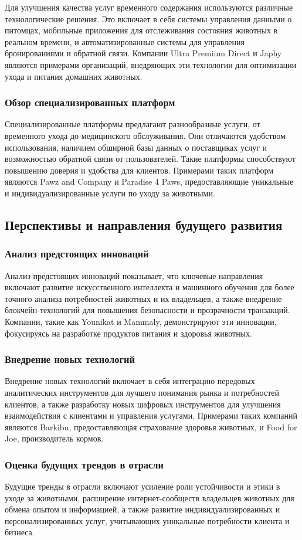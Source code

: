 Для улучшения качества услуг временного содержания используются различные технологические решения. Это включает в себя системы управления данными о питомцах, мобильные приложения для отслеживания состояния животных в реальном времени, и автоматизированные системы для управления бронированиями и обратной связи. Компании Ultra Premium Direct и Japhy являются примерами организаций, внедряющих эти технологии для оптимизации ухода и питания домашних животных.
\subsubsection{Обзор специализированных платформ}

Специализированные платформы предлагают разнообразные услуги, от временного ухода до медицинского обслуживания. Они отличаются удобством использования, наличием обширной базы данных о поставщиках услуг и возможностью обратной связи от пользователей. Такие платформы способствуют повышению доверия и удобства для клиентов. Примерами таких платформ являются Pawz and Company и Paradise 4 Paws, предоставляющие уникальные и индивидуализированные услуги по уходу за животными.
\subsection{Перспективы и направления будущего развития}
\subsubsection{Анализ предстоящих инноваций}

Анализ предстоящих инноваций показывает, что ключевые направления включают развитие искусственного интеллекта и машинного обучения для более точного анализа потребностей животных и их владельцев, а также внедрение блокчейн-технологий для повышения безопасности и прозрачности транзакций. Компании, такие как Younikat и Mammaly, демонстрируют эти инновации, фокусируясь на разработке продуктов питания и здоровья животных.
\subsubsection{Внедрение новых технологий}

Внедрение новых технологий включает в себя интеграцию передовых аналитических инструментов для лучшего понимания рынка и потребностей клиентов, а также разработку новых цифровых инструментов для улучшения взаимодействия с клиентами и управления услугами. Примерами таких компаний являются Barkibu, предоставляющая страхование здоровья животных, и Food for Joe, производитель кормов.
\subsubsection{Оценка будущих трендов в отрасли}

Будущие тренды в отрасли включают усиление роли устойчивости и этики в уходе за животными, расширение интернет-сообществ владельцев животных для обмена опытом и информацией, а также развитие индивидуализированных и персонализированных услуг, учитывающих уникальные потребности клиента и бизнеса.
